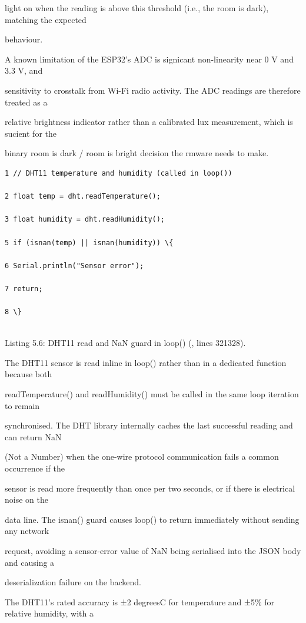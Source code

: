 light on when the reading is above this threshold (i.e., the room is dark), matching the expected

behaviour.

A known limitation of the ESP32's ADC is signicant non-linearity near 0 V and 3.3 V, and

sensitivity to crosstalk from Wi-Fi radio activity. The ADC readings are therefore treated as a

relative brightness indicator rather than a calibrated lux measurement, which is sucient for the

binary room is dark / room is bright decision the rmware needs to make.

\begin{listingbox}
	\begin{verbatim}
1 // DHT11 temperature and humidity (called in loop())

2 float temp = dht.readTemperature();

3 float humidity = dht.readHumidity();

5 if (isnan(temp) || isnan(humidity)) \{

6 Serial.println("Sensor error");

7 return;

8 \}


\end{verbatim}
\end{listingbox}
Listing 5.6: DHT11 read and NaN guard in loop() (, lines 321328).

The DHT11 sensor is read inline in loop() rather than in a dedicated function because both

readTemperature() and readHumidity() must be called in the same loop iteration to remain

synchronised. The DHT library internally caches the last successful reading and can return NaN

(Not a Number) when the one-wire protocol communication fails  a common occurrence if the

sensor is read more frequently than once per two seconds, or if there is electrical noise on the

data line. The isnan() guard causes loop() to return immediately without sending any network

request, avoiding a sensor-error value of NaN being serialised into the JSON body and causing a

deserialization failure on the backend.

The DHT11's rated accuracy is ±2 degreesC for temperature and ±5\% for relative humidity, with a

